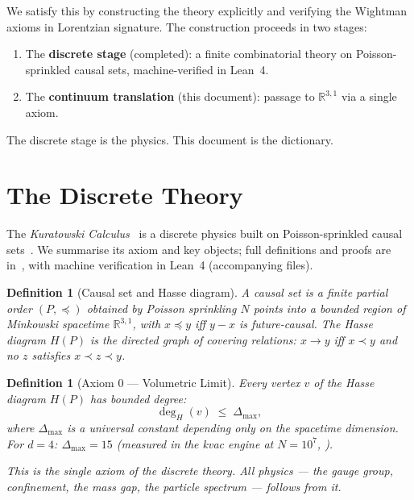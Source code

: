 \documentclass[11pt]{article}
\newtheorem{definition}[theorem]{Definition}
\begin{document}
We satisfy this by constructing the theory explicitly and
verifying the Wightman axioms in Lorentzian signature.
The construction proceeds in two stages:
\begin{enumerate}
\item The \textbf{discrete stage} (completed): a finite
  combinatorial theory on Poisson-sprinkled causal sets,
  machine-verified in Lean~4.
\item The \textbf{continuum translation} (this document):
  passage to $\mathbb{R}^{3,1}$ via a single axiom.
\end{enumerate}

The discrete stage is the physics.  This document is the
dictionary.

\section{The Discrete Theory}
\label{sec:discrete}

The \emph{Kuratowski Calculus}~\cite{SilvaAlvarado26} is a
discrete physics built on Poisson-sprinkled causal
sets~\cite{BLMS87}.  We summarise its axiom and key
objects; full definitions and proofs are
in~\cite{SilvaAlvarado26}, with machine verification in
Lean~4 (accompanying files).

\begin{definition}[Causal set and Hasse diagram]
\label{def:causal-set-intro}
A \emph{causal set} is a finite partial order
$(P, \preceq)$ obtained by Poisson sprinkling $N$ points
into a bounded region of Minkowski spacetime
$\mathbb{R}^{3,1}$, with $x \preceq y$ iff $y - x$ is
future-causal.  The \emph{Hasse diagram} $H(P)$ is the
directed graph of covering relations: $x \to y$ iff
$x \prec y$ and no $z$ satisfies $x \prec z \prec y$.
\end{definition}

\begin{definition}[Axiom 0 --- Volumetric Limit]
\label{def:axiom0}
Every vertex $v$ of the Hasse diagram $H(P)$ has bounded
degree:
\[
  \deg_H(v) \;\le\; \Delta_{\max},
\]
where $\Delta_{\max}$ is a universal constant depending only
on the spacetime dimension.  For $d = 4$:
$\Delta_{\max} = 15$
(measured in the kvac engine at $N = 10^7$,
\cite{SilvaAlvarado26}).

This is the single axiom of the discrete theory.  All
physics --- the gauge group, confinement, the mass gap, the
particle spectrum --- follows from it.
\end{definition}
\end{document}

